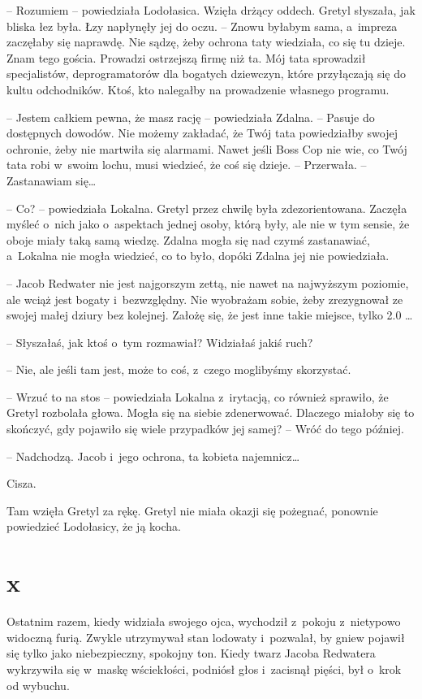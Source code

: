 \documentclass[oneside,polish,11pt,sfheadings]{mwbk}
\begin{document}
-- Rozumiem -- powiedziała Lodołasica. Wzięła drżący oddech. Gretyl
słyszała, jak bliska łez była. Łzy napłynęły jej do oczu. -- Znowu
byłabym sama, a~impreza zaczęłaby się naprawdę. Nie sądzę, żeby ochrona
taty wiedziała, co się tu dzieje. Znam tego gościa. Prowadzi ostrzejszą
firmę niż ta. Mój tata sprowadził specjalistów, deprogramatorów dla
bogatych dziewczyn, które przyłączają się do kultu odchodników. Ktoś,
kto nalegałby na prowadzenie własnego programu.

-- Jestem całkiem pewna, że masz rację -- powiedziała Zdalna. -- Pasuje do
dostępnych dowodów. Nie możemy zakładać, że Twój tata powiedziałby
swojej ochronie, żeby nie martwiła się alarmami. Nawet jeśli Boss Cop
nie wie, co Twój tata robi w~swoim lochu, musi wiedzieć, że coś się
dzieje. -- Przerwała. -- Zastanawiam się\ldots 

-- Co? -- powiedziała Lokalna. Gretyl przez chwilę była zdezorientowana.
Zaczęła myśleć o~nich jako o~aspektach jednej osoby, którą były, ale nie
w tym sensie, że oboje miały taką samą wiedzę. Zdalna mogła się nad
czymś zastanawiać, a~Lokalna nie mogła wiedzieć, co to było, dopóki
Zdalna jej nie powiedziała.

-- Jacob Redwater nie jest najgorszym zettą, nie nawet na najwyższym
poziomie, ale wciąż jest bogaty i~bezwzględny. Nie wyobrażam sobie, żeby
zrezygnował ze swojej małej dziury bez kolejnej. Założę się, że jest
inne takie miejsce, tylko 2.0 \ldots 

-- Słyszałaś, jak ktoś o~tym rozmawiał? Widziałaś jakiś ruch?

-- Nie, ale jeśli tam jest, może to coś, z~czego moglibyśmy skorzystać.

-- Wrzuć to na stos -- powiedziała Lokalna z~irytacją, co również
sprawiło, że Gretyl rozbolała głowa. Mogła się na siebie zdenerwować.
Dlaczego miałoby się to skończyć, gdy pojawiło się wiele przypadków jej
samej? -- Wróć do tego później.

-- Nadchodzą. Jacob i~jego ochrona, ta kobieta najemnicz\ldots 

Cisza.

Tam wzięła Gretyl za rękę. Gretyl nie miała okazji się pożegnać,
ponownie powiedzieć Lodołasicy, że ją kocha.

\chapter*{x}

Ostatnim razem, kiedy widziała swojego ojca, wychodził z~pokoju z~nietypowo widoczną furią. Zwykle utrzymywał stan lodowaty i~pozwalał, by
gniew pojawił się tylko jako niebezpieczny, spokojny ton. Kiedy twarz
Jacoba Redwatera wykrzywiła się w~maskę wściekłości, podniósł głos i~zacisnął pięści, był o~krok od wybuchu.
\end{document}
